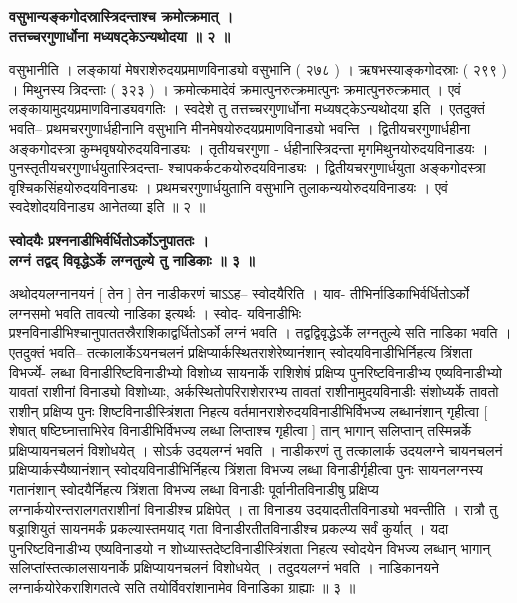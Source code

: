 \documentclass[11pt, openany]{book}
\begin{document}
{{{{\vspace{2mm}
\centering
\textbf{
\hspace{-0.8cm}
 वसुभान्यङ्कगोदस्रास्त्रिदन्ताश्च क्रमोत्क्रमात् ।\\
 तत्तच्चरगुणार्धोना मध्यषट्केऽन्यथोदया ॥ २ ॥}

\vspace{2mm}
\justifying
 वसुभानीति । लङ्कायां मेषराशेरुदयप्रमाणविनाड्यो वसुभानि ( २७८ ) । 
ऋषभस्याङ्कगोदस्राः ( २९९ ) । मिथुनस्य त्रिदन्ताः ( ३२३ ) । क्रमोत्कमादेवं
क्रमात्पुनरुत्क्रमात्पुनः क्रमात्पुनरुत्क्रमात् । एवं
लङ्कायामुदयप्रमाणविनाड्यवगतिः ।
स्वदेशे तु तत्तच्चरगुणार्धोना मध्यषट्केऽन्यथोदया इति ।
एतदुक्तं 
भवति-- प्रथमचरगुणार्धहीनानि वसुभानि मीनमेषयोरुदयप्रमाणविनाड्यो
भवन्ति । 
द्वितीयचरगुणार्धहीना अङ्कगोदस्त्रा कुम्भवृषयोरुदयविनाड्यः ।
तृतीयचरगुणा -
र्धहीनास्त्रिदन्ता मृगमिथुनयोरुदयविनाडयः ।
पुनस्तृतीयचरगुणार्धयुतास्त्रिदन्ता-
श्चापकर्कटकयोरुदयविनाड्यः । द्वितीयचरगुणार्धयुता अङ्कगोदस्त्रा
वृश्चिकसिंहयोरुदयविनाड्यः ।
प्रथमचरगुणार्धयुतानि वसुभानि तुलाकन्ययोरुदयविनाडयः ।
एवं स्वदेशोदयविनाड्य आनेतव्या इति ॥ २ ॥ 

\vspace{2mm}
\centering
\textbf{
\hspace{-2.2cm}
 स्वोदयैः प्रश्ननाडीभिर्वर्धितोऽर्कोऽनुपाततः । \\
 लग्नं तद्वद् विवृद्धेऽर्के लग्नतुल्ये तु नाडिकाः ॥ ३ ॥ }

\newpage
\thispagestyle{fancy}
\fancyhf{}
\lhead{[त्रिप्रश्नाधिकारः]}
\justifying
 अथोदयलग्नानयनं [ तेन ] तेन नाडीकरणं चाऽऽह-- स्वोदयैरिति ।
याव-
तीभिर्नाडिकाभिर्वर्धितोऽर्को लग्नसमो भवति तावत्यो नाडिका इत्यर्थः ।
स्वोद-
यविनाडीभिः प्रश्नविनाडीभिश्चानुपाततस्रैराशिकाद्वर्धितोऽर्को लग्नं भवति
। 
तद्वद्विवृद्धेऽर्के लग्नतुल्ये सति नाडिका भवति । एतदुक्तं भवति--
तत्कालार्केऽयनचलनं
प्रक्षिप्यार्कस्थितराशेरेष्यानंशान् स्वोदयविनाडीभिर्निहत्य
त्रिंशता विभर्ज्ये-
लब्धा विनाडीरिष्टविनाडीभ्यो विशोध्य सायनार्के राशिशेषं प्रक्षिप्य पुनरिष्टविनाडीभ्य
एष्यविनाडीभ्यो यावतां राशीनां विनाड्यो विशोध्याः, 
अर्कस्थितोपरिराशेरारभ्य तावतां राशीनामुदयविनाडीः संशोध्यर्के तावतो 
राशीन् प्रक्षिप्य पुनः शिष्टविनाडीस्त्रिंशता निहत्य
वर्तमानराशेरुदयविनाडीभिर्विभज्य
लब्धानंशान् गृहीत्वा [ शेषात् षष्टिघ्नात्ताभिरेव
विनाडीभिर्विभज्य
लब्धा लिप्ताश्च गृहीत्वा ] तान् भागान् सलिप्तान् तस्मिन्नर्के
प्रक्षिप्यायनचलनं 
विशोधयेत् । सोऽर्क उदयलग्नं भवति । नाडीकरणं तु तत्कालार्क उदयलग्ने
चायनचलनं प्रक्षिप्यार्कस्यैष्यानंशान् स्वोदयविनाडीभिर्निहत्य त्रिंशता
विभज्य 
लब्धा विनाडीर्गृहीत्वा पुनः सायनलग्नस्य गतानंशान् स्वोदयैर्निहत्य
त्रिंशता 
विभज्य लब्धा विनाडीः पूर्वानीतविनाडीषु प्रक्षिप्य
लग्नार्कयोरन्तरालगतराशीनां
विनाडीश्च प्रक्षिपेत् । ता विनाडय उदयादतीतविनाड्यो भवन्तीति
। 
रात्रौ तु षड्राशियुतं सायनमर्कं प्रकल्यास्तमयाद् गता
विनाडीरतीतविनाडीश्च 
प्रकल्प्य सर्वं कुर्यात् । यदा पुनरिष्टविनाडीभ्य एष्यविनाडयो न 
शोध्यास्तदेष्टविनाडीस्त्रिंशता
निहत्य स्वोदयेन विभज्य लब्धान् भागान् सलिप्तांस्तत्कालसायनार्के
प्रक्षिप्यायनचलनं विशोधयेत् । तदुदयलग्नं भवति । 
नाडिकानयने लग्नार्कयोरेकराशिगतत्वे सति तयोर्विवरांशानामेव विनाडिका 
ग्राह्याः ॥ ३ ॥ 

}}}}
\end{document}
